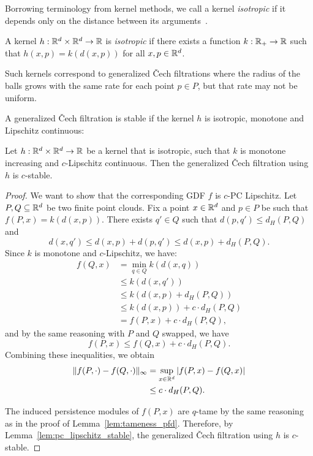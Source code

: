 Borrowing terminology from kernel methods, we call a kernel \emph{isotropic}
if it depends only on the distance between its
arguments~\cite{genton2001classes}.
\begin{definition}
    A kernel $h : \mathbb{R}^d \times \mathbb{R}^d \to \mathbb{R}$ is \emph{isotropic} if there exists a
    function $k : \mathbb{R}_+ \to \mathbb{R}$ such that $h(x, p) = k(d(x, p))$ for all
    $x, p \in \mathbb{R}^d$.
\end{definition}
Such kernels correspond to generalized \v{C}ech filtrations where the radius of
the balls grows with the same rate for each point $p \in P$, but that
rate may not be uniform.

A generalized \v{C}ech filtration is stable if the kernel $h$ is isotropic,
monotone and Lipschitz continuous:
\begin{theorem}
    \label{thm:stable_isotropic}
    Let $h : \mathbb{R}^d \times \mathbb{R}^d \to \mathbb{R}$ be a kernel that is isotropic, such that
    $k$ is monotone increasing and $c$-Lipschitz continuous. Then the
    generalized \v{C}ech filtration using $h$ is $c$-stable.
\end{theorem}
\begin{proof}
    We want to show that the corresponding GDF $f$ is $c$-PC Lipschitz. Let $P,
    Q \subseteq \mathbb{R}^d$ be two finite point clouds. Fix a point $x \in \mathbb{R}^d$ and
    $p \in P$ be such that $f(P, x) = k(d(x, p))$. There exists $q' \in Q$ such
    that $d(p, q') \leq d_H(P, Q)$ and
    \begin{equation}
        d(x, q') \leq d(x, p) + d(p, q') \leq d(x, p) + d_H(P, Q).
    \end{equation}
    Since $k$ is monotone and $c$-Lipschitz, we have:
    \begin{align}
        f(Q, x) & = \min_{q \in Q} k(d(x, q)) \\
        & \leq k(d(x, q')) \\
        & \leq k(d(x, p) + d_H(P, Q)) \\
        & \leq k(d(x, p)) + c \cdot d_H(P, Q) \\
        & = f(P, x) + c \cdot d_H(P, Q),
    \end{align}
    and by the same reasoning with $P$ and $Q$ swapped, we have
    \begin{equation}
        f(P, x) \leq f(Q, x) + c \cdot d_H(P, Q).
    \end{equation}
    Combining these inequalities, we obtain
    \begin{align}
        \lVert f(P, \cdot) - f(Q, \cdot)\rVert_\infty
        & = \sup_{x \in \mathbb{R}^d} |f(P, x) - f(Q, x)| \\
        & \leq c \cdot d_H(P, Q).
    \end{align}

    The induced persistence modules of $f(P, x)$ are $q$-tame by the same
    reasoning as in the proof of Lemma~\ref{lem:tameness_pfd}. Therefore, by
    Lemma~\ref{lem:pc_lipschitz_stable}, the generalized \v{C}ech
    filtration using $h$ is $c$-stable.
\end{proof}

